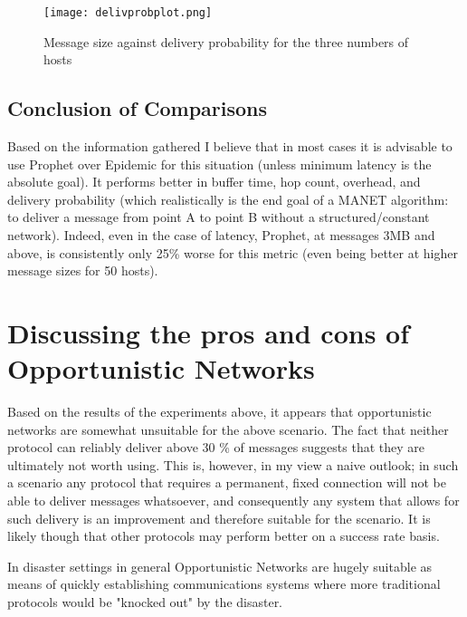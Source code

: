 \documentclass[12pt]{report}
\begin{document}
\begin{figure}[ht]
  \caption{Message size against delivery probability for the three numbers of hosts}
  \centering
  \texttt{[image: delivprobplot.png]}
  \label{fig:delivprob}
\end{figure}

\subsection{Conclusion of Comparisons}
Based on the information gathered I believe that in most cases it is advisable to use Prophet over Epidemic for this situation (unless minimum latency is the absolute goal).
It performs better in buffer time, hop count, overhead, and delivery probability (which realistically is the end goal of a MANET algorithm: to deliver a message from point A to point B without a structured/constant network).
Indeed, even in the case of latency, Prophet, at messages 3MB and above, is consistently only 25\% worse for this metric (even being better at higher message sizes for 50 hosts).

\section{Discussing the pros and cons of Opportunistic Networks}
Based on the results of the experiments above, it appears that opportunistic networks are somewhat unsuitable for the above scenario.
The fact that neither protocol can reliably deliver above 30 \% of messages suggests that they are ultimately not worth using.
This is, however, in my view a naive outlook; in such a scenario any protocol that requires a permanent, fixed connection will not be able to deliver messages whatsoever, and consequently any system that allows for such delivery is an improvement and therefore suitable for the scenario.
It is likely though that other protocols may perform better on a success rate basis.

\par

In disaster settings in general Opportunistic Networks are hugely suitable as means of quickly establishing communications systems where more traditional protocols would be "knocked out" by the disaster.

\par
\end{document}
